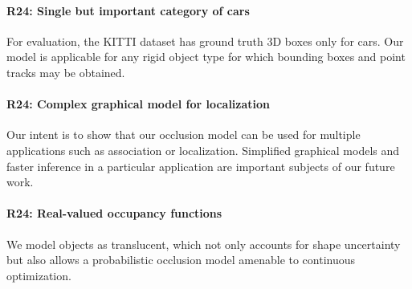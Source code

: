 \documentclass[10pt,twocolumn,letterpaper]{article}
\begin{document}
\vspace{-0.4cm}
\paragraph{R24: Single but important category of cars} For evaluation, the KITTI dataset has ground truth 3D boxes only for cars. Our model is applicable for any rigid object type for which bounding boxes and point tracks may be obtained.


\vspace{-0.4cm}
\paragraph{R24: Complex graphical model for localization} 
Our intent is to show that our occlusion model can be used for multiple applications such as association or localization. Simplified graphical models and faster inference in a particular application are important subjects of our future work.

\vspace{-0.4cm}
\paragraph{R24: Real-valued occupancy functions}
We model objects as translucent, which not only accounts for shape uncertainty but also allows a probabilistic occlusion model amenable to continuous optimization.


\vspace{-0.4cm}
\end{document}
